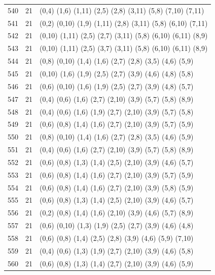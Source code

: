 \begin{appendix}
{\begin{longtable}{lll}
    540& 21 & (0,4)   (1,6)   (1,11)  (2,5)   (2,8)   (3,11)  (5,8)   (7,10)  (7,11)\\
    541& 21 & (0,2)   (0,10)  (1,9)   (1,11)  (2,8)   (3,11)  (5,8)   (6,10)  (7,11)\\
    542& 21 & (0,10)  (1,11)  (2,5)   (2,7)   (3,11)  (5,8)   (6,10)  (6,11)  (8,9)\\
    543& 21 & (0,10)  (1,11)  (2,5)   (3,7)   (3,11)  (5,8)   (6,10)  (6,11)  (8,9)\\
    544& 21 & (0,8)   (0,10)  (1,4)   (1,6)   (2,7)   (2,8)   (3,5)   (4,6)   (5,9)\\
    545& 21 & (0,10)  (1,6)   (1,9)   (2,5)   (2,7)   (3,9)   (4,6)   (4,8)   (5,8)\\
    546& 21 & (0,6)   (0,10)  (1,6)   (1,9)   (2,5)   (2,7)   (3,9)   (4,8)   (5,7)\\
    547& 21 & (0,4)   (0,6)   (1,6)   (2,7)   (2,10)  (3,9)   (5,7)   (5,8)   (8,9)\\
    548& 21 & (0,4)   (0,6)   (1,6)   (1,9)   (2,7)   (2,10)  (3,9)   (5,7)   (5,8)\\
    549& 21 & (0,6)   (0,8)   (1,4)   (1,6)   (2,7)   (2,10)  (3,9)   (5,7)   (5,9)\\
    550& 21 & (0,8)   (0,10)  (1,4)   (1,6)   (2,7)   (2,8)   (3,5)   (4,6)   (5,9)\\
    551& 21 & (0,4)   (0,6)   (1,6)   (2,7)   (2,10)  (3,9)   (5,7)   (5,8)   (8,9)\\
    552& 21 & (0,6)   (0,8)   (1,3)   (1,4)   (2,5)   (2,10)  (3,9)   (4,6)   (5,7)\\
    553& 21 & (0,6)   (0,8)   (1,4)   (1,6)   (2,7)   (2,10)  (3,9)   (5,7)   (5,9)\\
    554& 21 & (0,6)   (0,8)   (1,4)   (1,6)   (2,7)   (2,10)  (3,9)   (5,8)   (5,9)\\
    555& 21 & (0,6)   (0,8)   (1,3)   (1,4)   (2,5)   (2,10)  (3,9)   (4,6)   (5,7)\\
    556& 21 & (0,2)   (0,8)   (1,4)   (1,6)   (2,10)  (3,9)   (4,6)   (5,7)   (8,9)\\
    557& 21 & (0,6)   (0,10)  (1,3)   (1,9)   (2,5)   (2,7)   (3,9)   (4,6)   (4,8)\\
    558& 21 & (0,6)   (0,8)   (1,4)   (2,5)   (2,8)   (3,9)   (4,6)   (5,9)   (7,10)\\
    559& 21 & (0,4)   (0,6)   (1,3)   (1,9)   (2,7)   (2,10)  (3,9)   (4,6)   (5,8)\\
    560& 21 & (0,6)   (0,8)   (1,3)   (1,4)   (2,7)   (2,10)  (3,9)   (4,6)   (5,9)\\

\end{longtable}}
\end{appendix}
